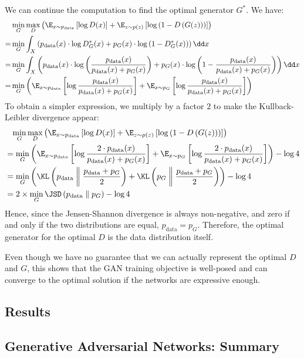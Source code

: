 We can continue the computation to find the optimal generator $G^*$. We have:
\begin{align*}
    &\min_G\max_D \left(
        \E_{x\sim p_{\text{data}}}\left[\log D(x)\right] + \E_{z\sim p(z)}\left[\log\left(1-D\left(G(z)\right)\right)\right]
    \right) \\
    = &\min_G
        \int_X \left( p_{\text{data}}(x)\cdot\log D^*_G(x) + p_G(x)\cdot\log\left(1-D^*_G(x)\right) \right) \dd x \\
    = &\min_G
        \int_X \left( p_{\text{data}}(x)\cdot\log\left(\frac{p_{\text{data}}(x)}{p_{\text{data}}(x) + p_G(x)}\right) + p_G(x)\cdot\log\left(1-\frac{p_{\text{data}}(x)}{p_{\text{data}}(x) + p_G(x)}\right) \right) \dd x \\
    = &\min_G
        \left( \E_{x\sim p_{\text{data}}}\left[\log\frac{p_{\text{data}}(x)}{p_{\text{data}}(x) + p_G(x)}\right] + \E_{x\sim p_G}\left[\log \frac{p_{\text{data}}(x)}{p_{\text{data}}(x) + p_G(x)}\right] \right) \\
\end{align*}
To obtain a simpler expression, we multiply by a factor $2$ to make the Kullback-Leibler divergence appear:
\begin{align*}
    &\phantom{=}\min_G\max_D \left(
        \E_{x\sim p_{\text{data}}}\left[\log D(x)\right] + \E_{z\sim p(z)}\left[\log\left(1-D\left(G(z)\right)\right)\right]
    \right) \\
    &=\min_G
        \left( \E_{x\sim p_{\text{data}}}\left[\log\frac{2\cdot p_{\text{data}}(x)}{p_{\text{data}}(x) + p_G(x)}\right] + \E_{x\sim p_G}\left[\log \frac{2\cdot p_{\text{data}}(x)}{p_{\text{data}}(x) + p_G(x)}\right]\right) - \log4 \\
    &= \min_G
        \left(\KL\left(
            p_{\text{data}}\;\middle\|\;\frac{p_{\text{data}}+p_G}{2}
        \right) + \KL\left(
            p_G\;\middle\|\;\frac{p_{\text{data}}+p_G}{2}
        \right)\right) - \log4 \\
    &= 2\times\min_G \JSD\left(p_{\text{data}}\;\middle\|\; p_G\right) - \log4 \\
\end{align*}
Hence, since the Jensen-Shannon divergence is always non-negative, and zero if and only if the two distributions are equal, $p_{\text{data}} = p_G$. Therefore, the optimal generator for the optimal $D$ is the data distribution itself.

Even though we have no guarantee that we can actually represent the optimal $D$ and $G$, this shows that the GAN training objective is well-posed and can converge to the optimal solution if the networks are expressive enough.

\subsection{Results}

\subsection*{Generative Adversarial Networks: Summary}

\newpage